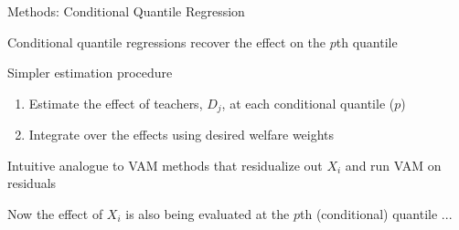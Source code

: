 \documentclass[t,aspectratio=169,11pt,presentation]{beamer}
\newenvironment{wideitemize}{\itemize\addtolength{\itemsep}{14pt}}{\enditemize}
\begin{document}
\begin{frame}{Methods: Conditional Quantile Regression}

\begin{wideitemize}

    \item Conditional quantile regressions recover the effect on the $p$th quantile
    
    \item Simpler estimation procedure
    \begin{enumerate}
        \item Estimate the effect of teachers, $D_j$, at each conditional quantile ($p$)
        \item Integrate over the effects using desired welfare weights
    \end{enumerate}

    \item Intuitive analogue to VAM methods that residualize out $X_i$ and run VAM on residuals
    
    \item Now the effect of $X_i$ is also being evaluated at the $p$th (conditional) quantile ...
    

\end{wideitemize}
\end{frame}

\end{document}
